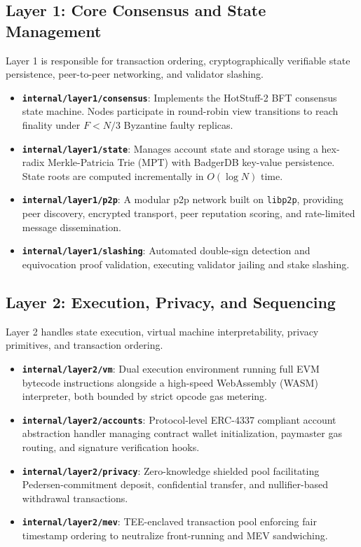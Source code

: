 \documentclass[10pt,journal,compsoc,twocolumn]{IEEEtran}
\begin{document}
\subsection{Layer 1: Core Consensus and State Management}
Layer 1 is responsible for transaction ordering, cryptographically verifiable state persistence, peer-to-peer networking, and validator slashing.
\begin{itemize}
    \item \textbf{\texttt{internal/layer1/consensus}}: Implements the HotStuff-2 BFT consensus state machine. Nodes participate in round-robin view transitions to reach finality under $F < N/3$ Byzantine faulty replicas.
    \item \textbf{\texttt{internal/layer1/state}}: Manages account state and storage using a hex-radix Merkle-Patricia Trie (MPT) with BadgerDB key-value persistence. State roots are computed incrementally in $O(\log N)$ time.
    \item \textbf{\texttt{internal/layer1/p2p}}: A modular p2p network built on \texttt{libp2p}, providing peer discovery, encrypted transport, peer reputation scoring, and rate-limited message dissemination.
    \item \textbf{\texttt{internal/layer1/slashing}}: Automated double-sign detection and equivocation proof validation, executing validator jailing and stake slashing.
\end{itemize}

\subsection{Layer 2: Execution, Privacy, and Sequencing}
Layer 2 handles state execution, virtual machine interpretability, privacy primitives, and transaction ordering.
\begin{itemize}
    \item \textbf{\texttt{internal/layer2/vm}}: Dual execution environment running full EVM bytecode instructions alongside a high-speed WebAssembly (WASM) interpreter, both bounded by strict opcode gas metering.
    \item \textbf{\texttt{internal/layer2/accounts}}: Protocol-level ERC-4337 compliant account abstraction handler managing contract wallet initialization, paymaster gas routing, and signature verification hooks.
    \item \textbf{\texttt{internal/layer2/privacy}}: Zero-knowledge shielded pool facilitating Pedersen-commitment deposit, confidential transfer, and nullifier-based withdrawal transactions.
    \item \textbf{\texttt{internal/layer2/mev}}: TEE-enclaved transaction pool enforcing fair timestamp ordering to neutralize front-running and MEV sandwiching.
\end{itemize}
\end{document}
